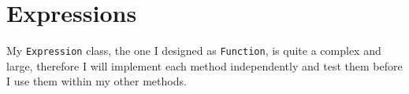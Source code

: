 \documentclass[../../../../main.tex]{subfiles}
\begin{document}
\section{Expressions}
My \texttt{Expression} class, the one I designed as \texttt{Function}, is quite a complex and large, therefore I will implement each method independently and test them before I use them within my other methods. 
\end{document}
